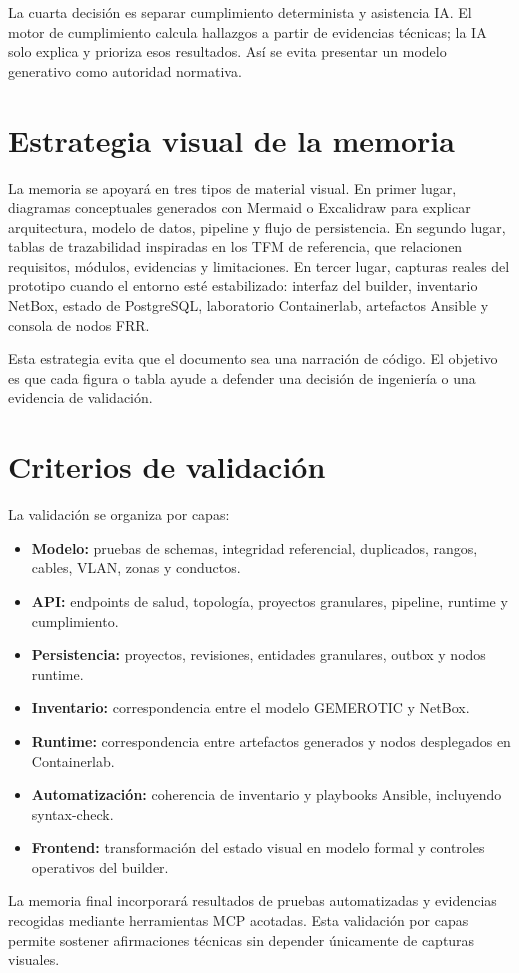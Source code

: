 La cuarta decisión es separar cumplimiento determinista y asistencia IA. El motor de cumplimiento calcula hallazgos a partir de evidencias técnicas; la IA solo explica y prioriza esos resultados. Así se evita presentar un modelo generativo como autoridad normativa.

\section{Estrategia visual de la memoria} \label{sec:estrategia-visual}

La memoria se apoyará en tres tipos de material visual. En primer lugar, diagramas conceptuales generados con Mermaid o Excalidraw para explicar arquitectura, modelo de datos, pipeline y flujo de persistencia. En segundo lugar, tablas de trazabilidad inspiradas en los TFM de referencia, que relacionen requisitos, módulos, evidencias y limitaciones. En tercer lugar, capturas reales del prototipo cuando el entorno esté estabilizado: interfaz del builder, inventario NetBox, estado de PostgreSQL, laboratorio Containerlab, artefactos Ansible y consola de nodos FRR.

Esta estrategia evita que el documento sea una narración de código. El objetivo es que cada figura o tabla ayude a defender una decisión de ingeniería o una evidencia de validación.

\section{Criterios de validación} \label{sec:criterios-validacion}

La validación se organiza por capas:

\begin{itemize}
    \item \textbf{Modelo:} pruebas de schemas, integridad referencial, duplicados, rangos, cables, VLAN, zonas y conductos.
    \item \textbf{API:} endpoints de salud, topología, proyectos granulares, pipeline, runtime y cumplimiento.
    \item \textbf{Persistencia:} proyectos, revisiones, entidades granulares, outbox y nodos runtime.
    \item \textbf{Inventario:} correspondencia entre el modelo GEMEROTIC y NetBox.
    \item \textbf{Runtime:} correspondencia entre artefactos generados y nodos desplegados en Containerlab.
    \item \textbf{Automatización:} coherencia de inventario y playbooks Ansible, incluyendo syntax-check.
    \item \textbf{Frontend:} transformación del estado visual en modelo formal y controles operativos del builder.
\end{itemize}

La memoria final incorporará resultados de pruebas automatizadas y evidencias recogidas mediante herramientas MCP acotadas. Esta validación por capas permite sostener afirmaciones técnicas sin depender únicamente de capturas visuales.
